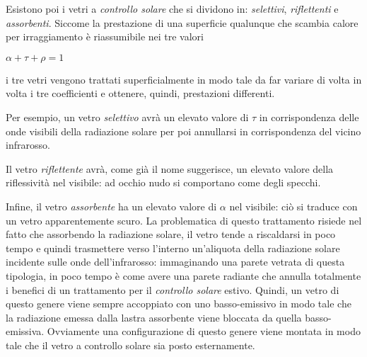 Esistono poi i vetri a \emph{controllo solare} che si dividono in: \emph{selettivi}, \emph{riflettenti} e \emph{assorbenti}. Siccome la prestazione di una superficie qualunque che scambia calore per irraggiamento è riassumibile nei tre valori
\begin{center}
	$\alpha + \tau + \rho = 1$
\end{center}
i tre vetri vengono trattati superficialmente in modo tale da far variare di volta in volta i tre coefficienti e ottenere, quindi, prestazioni differenti.

Per esempio, un vetro \emph{selettivo} avrà un elevato valore di $\tau$ in corrispondenza delle onde visibili della radiazione solare per poi annullarsi in corrispondenza del vicino infrarosso.

Il vetro \emph{riflettente} avrà, come già il nome suggerisce, un elevato valore della riflessività nel visibile: ad occhio nudo si comportano come degli specchi.

Infine, il vetro \emph{assorbente} ha un elevato valore di $\alpha$ nel visibile: ciò si traduce con un vetro apparentemente scuro. La problematica di questo trattamento risiede nel fatto che assorbendo la radiazione solare, il vetro tende a riscaldarsi in poco tempo e quindi trasmettere verso l'interno un'aliquota della radiazione solare incidente sulle onde dell'infrarosso: immaginando una parete vetrata di questa tipologia, in poco tempo è come avere una parete radiante che annulla totalmente i benefici di un trattamento per il \emph{controllo solare} estivo. Quindi, un vetro di questo genere viene sempre accoppiato con uno basso-emissivo in modo tale che la radiazione emessa dalla lastra assorbente viene bloccata da quella basso-emissiva. Ovviamente una configurazione di questo genere viene montata in modo tale che il vetro a controllo solare sia posto esternamente.

